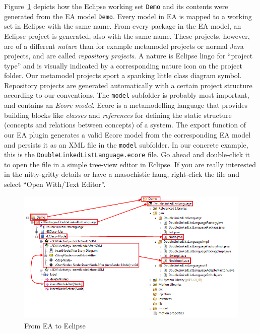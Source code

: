Figure~\ref{fig_fromEAtoEclipse} depicts how the Eclipse working set \texttt{Demo} and its contents were generated from the EA model \texttt{Demo}.
Every model in EA is mapped to a working set in Eclipse with the same name. 
From every package in the EA model, an Eclipse project is generated, also with the same name.
These projects, however, are of a different \emph{nature} than for example metamodel projects or normal Java projects, and are called \emph{repository projects}.  
A nature is Eclipse lingo for ``project type'' and is visually indicated by a corresponding nature icon on the project folder.
Our  metamodel projects sport a spanking little class diagram symbol. 
Repository projects are generated automatically  with a certain project structure according to our conventions.  
The  \texttt{model} subfolder is probably most important, and contains an  \emph{Ecore model}.  
Ecore is a metamodelling language that provides building  blocks like \emph{classes} and \emph{references} for defining the  static structure (concepts and relations between concepts) of a system.  
The  export function of our EA plugin generates a valid Ecore model from the  corresponding EA model and persists it as an XML file in the \texttt{model}  subfolder.  
In our concrete example, this is the \texttt{DoubleLinkedListLanguage.ecore} file.  
Go ahead and double-click it to open the file in a simple tree-view editor in Eclipse.  
If you are really interested in the nitty-gritty details or have a masochistic hang, right-click the file and select ``Open With/Text Editor''. 

\begin{figure}[htbp]
    \centering
  \includegraphics[width=\textwidth]{../installation_images/bothexplorers}
    \caption{From EA to Eclipse}
    \label{fig_fromEAtoEclipse}
\end{figure}

